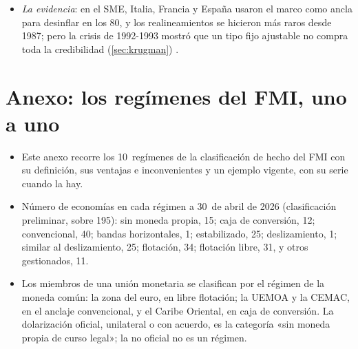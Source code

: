 \documentclass[11pt]{article}
\begin{document}
\begin{itemize}
  \begin{itemize}
  \item si el banco central de la unión no es el del ancla, sino uno nuevo en el que pesan los 2~países, su credibilidad puede ser menor que la del ancla: el país con sesgo gana algo, pero el ancla pierde, y no querrá la unión sin garantías (de ahí la independencia del BCE y su mandato de estabilidad de precios) ;
  \item renunciar a la moneda propia es renunciar también a un instrumento que, usado rara vez y con un cambio de política creíble, ha funcionado (Bélgica y Dinamarca en 1982);
  \item y la deuda pública pasa a emitirse en una moneda que el Gobierno no controla, lo que lo hace más vulnerable a una crisis de deuda soberana: lo que se gana en credibilidad monetaria puede perderse en fragilidad fiscal .
  \end{itemize}
\item \emph{La evidencia}: en el SME, Italia, Francia y España usaron el marco como ancla para desinflar en los 80, y los realineamientos se hicieron más raros desde 1987; pero la crisis de 1992-1993 mostró que un tipo fijo ajustable no compra toda la credibilidad (\ref{sec:krugman}) .
\end{itemize}

\section{Anexo: los regímenes del FMI, uno a uno}\label{anexo:regimenes}

\begin{itemize}
\item Este anexo recorre los 10~regímenes de la clasificación de hecho del FMI con su definición, sus ventajas e inconvenientes y un ejemplo vigente, con su serie cuando la hay\nocite{HabermeierEtAl2009Revised,FMI2026InformeAnual}.
\item Número de economías en cada régimen a 30~de abril de 2026 (clasificación preliminar, sobre 195): sin moneda propia, 15; caja de conversión, 12; convencional, 40; bandas horizontales, 1; estabilizado, 25; deslizamiento, 1; similar al deslizamiento, 25; flotación, 34; flotación libre, 31, y otros gestionados, 11\nocite{FMI2026InformeAnual}.
\item Los miembros de una unión monetaria se clasifican por el régimen de la moneda común: la zona del euro, en libre flotación; la UEMOA y la CEMAC, en el anclaje convencional, y el Caribe Oriental, en caja de conversión. La dolarización oficial, unilateral o con acuerdo, es la categoría «sin moneda propia de curso legal»; la no oficial no es un régimen.
\end{itemize}
\end{document}
